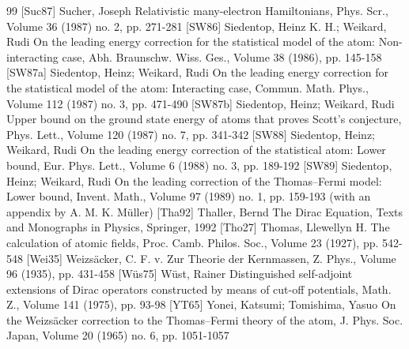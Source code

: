 \begin{thebibliography}{99}
 [Suc87] Sucher, Joseph Relativistic many-electron Hamiltonians, Phys. Scr., Volume 36 (1987) no. 2, pp. 271-281
 [SW86] Siedentop, Heinz K. H.; Weikard, Rudi On the leading energy correction for the statistical model of the atom: Non-interacting case, Abh. Braunschw. Wiss. Ges., Volume 38 (1986), pp. 145-158
 [SW87a] Siedentop, Heinz; Weikard, Rudi On the leading energy correction for the statistical model of the atom: Interacting case, Commun. Math. Phys., Volume 112 (1987) no. 3, pp. 471-490
 [SW87b] Siedentop, Heinz; Weikard, Rudi Upper bound on the ground state energy of atoms that proves Scott’s conjecture, Phys. Lett., Volume 120 (1987) no. 7, pp. 341-342
 [SW88] Siedentop, Heinz; Weikard, Rudi On the leading energy correction of the statistical atom: Lower bound, Eur. Phys. Lett., Volume 6 (1988) no. 3, pp. 189-192
 [SW89] Siedentop, Heinz; Weikard, Rudi On the leading correction of the Thomas–Fermi model: Lower bound, Invent. Math., Volume 97 (1989) no. 1, pp. 159-193 (with an appendix by A. M. K. Müller)
 [Tha92] Thaller, Bernd The Dirac Equation, Texts and Monographs in Physics, Springer, 1992
 [Tho27] Thomas, Llewellyn H. The calculation of atomic fields, Proc. Camb. Philos. Soc., Volume 23 (1927), pp. 542-548
 [Wei35] Weizsäcker, C. F. v. Zur Theorie der Kernmassen, Z. Phys., Volume 96 (1935), pp. 431-458
 [Wüs75] Wüst, Rainer Distinguished self-adjoint extensions of Dirac operators constructed by means of cut-off potentials, Math. Z., Volume 141 (1975), pp. 93-98
 [YT65] Yonei, Katsumi; Tomishima, Yasuo On the Weizsäcker correction to the Thomas–Fermi theory of the atom, J. Phys. Soc. Japan, Volume 20 (1965) no. 6, pp. 1051-1057
\end{thebibliography}
